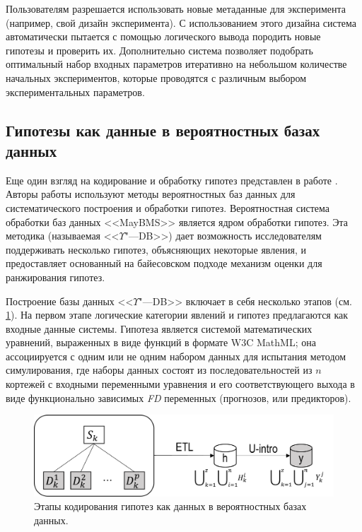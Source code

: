 Пользователям разрешается использовать новые метаданные для эксперимента (например, свой дизайн эксперимента). 
С использованием этого дизайна система автоматически пытается с помощью логического вывода породить новые 
гипотезы и проверить их. Дополнительно система позволяет подобрать оптимальный набор входных параметров 
итеративно на небольшом количестве начальных экспериментов, которые проводятся с различным выбором 
экспериментальных параметров.

\subsection{Гипотезы как данные в вероятностных базах данных}\label{sect1_3_2}
Еще один взгляд на кодирование и обработку гипотез представлен в работе \cite{GoncalvesP14}. Авторы работы используют 
методы вероятностных баз данных для систематического построения и обработки гипотез. Вероятностная система обработки 
баз данных <<MayBMS>> \cite{huang2009maybms} является ядром обработки гипотез. Эта методика (называемая 
<<$\Upsilon$"---DB>>) дает возможность исследователям поддерживать несколько гипотез, объясняющих некоторые явления, 
и предоставляет основанный на байесовском подходе механизм оценки для ранжирования гипотез.

Построение базы данных <<$\Upsilon$"---DB>> включает в себя несколько этапов (см. \cref{fig:Upsilon_db_pipeline}). 
На первом этапе логические категории явлений и гипотез предлагаются как входные данные системы. Гипотеза является 
системой математических уравнений, выраженных в виде функций в формате W3C MathML; она ассоциируется с одним или не 
одним набором данных для испытания методом симулирования, где наборы данных состоят из последовательностей из $n$ 
кортежей с входными переменными уравнения и его соответствующего выхода в виде функционально зависимых \textit{FD} 
переменных (прогнозов, или предикторов). 

\begin{figure}[ht]
    \centering
    \includegraphics[width=0.7\linewidth]{images/Upsilon_db_pipeline.pdf}
    \caption{Этапы кодирования гипотез как данных в вероятностных базах данных.}\label{fig:Upsilon_db_pipeline}
\end{figure}

